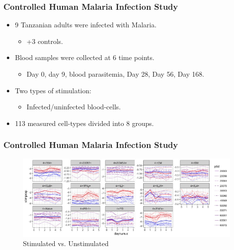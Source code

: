\documentclass{beamer}
\theoremstyle{definition}
\begin{document}

\begin{frame}
\frametitle{Controlled Human Malaria Infection Study}
\begin{itemize}
\item 9 Tanzanian adults were infected with Malaria.
	\begin{itemize}
	\item +3 controls.
	\end{itemize}
	\vspace{0.75 cm}
	
\item Blood samples were collected at 6 time points.
	\begin{itemize}
	\item Day 0, day 9, blood  parasitemia, Day 28, Day 56, Day 168.
	\end{itemize}
	\vspace{0.75 cm}

\item Two types of stimulation:
	\begin{itemize}
	\item Infected/uninfected blood-cells.
	\end{itemize}
	\vspace{0.75 cm}
	
\item 113 measured cell-types divided into 8 groups. 
\end{itemize}
\end{frame}


\begin{frame}
\frametitle{Controlled Human Malaria Infection Study}
\begin{figure}[]
\includegraphics[width=13 cm]{figures/4plusSmoothed} \caption{Stimulated vs. Unstimulated}
\end{figure}
\end{frame}
\end{document}

